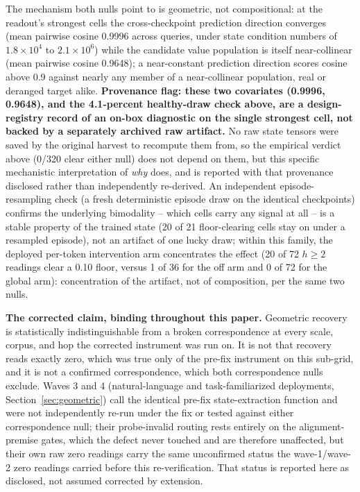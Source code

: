 \documentclass{article} %
\begin{document}
The mechanism both nulls point to is geometric, not compositional: at the
readout's strongest cells the cross-checkpoint prediction direction
converges (mean pairwise cosine 0.9996 across queries, under state
condition numbers of $1.8{\times}10^4$ to $2.1{\times}10^6$) while the
candidate value population is itself near-collinear (mean pairwise cosine
0.9648); a near-constant prediction direction scores cosine above 0.9
against nearly any member of a near-collinear population, real or
deranged target alike. \textbf{Provenance flag: these two covariates
(0.9996, 0.9648), and the 4.1-percent healthy-draw check above, are a
design-registry record of an on-box diagnostic on the single strongest
cell, not backed by a separately archived raw artifact.} No raw state
tensors were saved by the original harvest to recompute them from, so the
empirical verdict above (0/320 clear either null) does not depend on them,
but this specific mechanistic interpretation of \emph{why} does, and is
reported with that provenance disclosed rather than independently
re-derived.
An independent episode-resampling check (a fresh deterministic episode
draw on the identical checkpoints) confirms the underlying bimodality --
which cells carry any signal at all -- is a stable property of the trained
state (20 of 21 floor-clearing cells stay on under a resampled episode),
not an artifact of one lucky draw; within this family, the deployed
per-token intervention arm concentrates the effect (20 of 72 $h{\geq}2$
readings clear a 0.10 floor, versus 1 of 36 for the off arm and 0 of 72
for the global arm): concentration of the artifact, not of composition,
per the same two nulls. %

\textbf{The corrected claim, binding throughout this paper.} Geometric
recovery is statistically indistinguishable from a broken correspondence at
every scale, corpus, and hop the corrected instrument was run on. It is
not that recovery reads exactly zero, which was true only of the pre-fix
instrument on this sub-grid, and it is not a confirmed correspondence,
which both correspondence nulls exclude. Waves 3 and 4 (natural-language
and task-familiarized deployments, Section~\ref{sec:geometric}) call the
identical pre-fix state-extraction function and were not independently
re-run under the fix or tested against either correspondence null; their
probe-invalid routing rests entirely on the alignment-premise gates, which
the defect never touched and are therefore unaffected, but their own raw
zero readings carry the same unconfirmed status the wave-1/wave-2 zero
readings carried before this re-verification. That status is reported
here as disclosed, not assumed corrected by extension.
\end{document}
